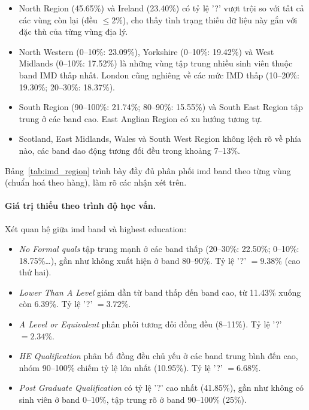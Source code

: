 \documentclass[a4paper]{article}
\newcommand{\code}[1]{{\ttfamily\def\_{\textunderscore\discretionary{}{}{}}#1}}
\def\code#1{#1}%
\def\_{ }%
\begin{document}
\begin{itemize}[leftmargin=*]
  \item North Region (45.65\%) và Ireland (23.40\%) có tỷ lệ \code{'?'} vượt
        trội so với tất cả các vùng còn lại (đều $\le 2\%$), cho thấy tình trạng
        thiếu dữ liệu này gắn với đặc thù của từng vùng địa lý.
  \item North Western (0--10\%: 23.09\%), Yorkshire (0--10\%: 19.42\%) và West
        Midlands (0--10\%: 17.52\%) là những vùng tập trung nhiều sinh viên
        thuộc band IMD thấp nhất. London cũng nghiêng về các mức IMD thấp
        (10--20\%: 19.30\%; 20--30\%: 18.37\%).
  \item South Region (90--100\%: 21.74\%; 80--90\%: 15.55\%) và South East Region
        tập trung ở các band cao. East Anglian Region có xu hướng tương tự.
  \item Scotland, East Midlands, Wales và South West Region không lệch rõ về phía
        nào, các band dao động tương đối đều trong khoảng 7--13\%.
\end{itemize}

Bảng~\ref{tab:imd_region} trình bày đầy đủ phân phối \code{imd\_band} theo từng
vùng (chuẩn hoá theo hàng), làm rõ các nhận xét trên.



\paragraph{Giá trị thiếu theo trình độ học vấn.}
Xét quan hệ giữa \code{imd\_band} và \code{highest\_education}:

\begin{itemize}[leftmargin=*]
  \item \textit{No Formal quals} tập trung mạnh ở các band thấp (20--30\%:
        22.50\%; 0--10\%: 18.75\%\ldots), gần như không xuất hiện ở band 80--90\%.
        Tỷ lệ \code{'?'} $= 9.38\%$ (cao thứ hai).
  \item \textit{Lower Than A Level} giảm dần từ band thấp đến band cao, từ
        11.43\% xuống còn 6.39\%. Tỷ lệ \code{'?'} $= 3.72\%$.
  \item \textit{A Level or Equivalent} phân phối tương đối đồng đều (8--11\%).
        Tỷ lệ \code{'?'} $= 2.34\%$.
  \item \textit{HE Qualification} phân bố đồng đều chủ yếu ở các band trung bình
        đến cao, nhóm 90--100\% chiếm tỷ lệ lớn nhất (10.95\%). Tỷ lệ \code{'?'}
        $= 6.68\%$.
  \item \textit{Post Graduate Qualification} có tỷ lệ \code{'?'} cao nhất
        (41.85\%), gần như không có sinh viên ở band 0--10\%, tập trung rõ ở band
        90--100\% (25\%).
\end{itemize}
\end{document}
